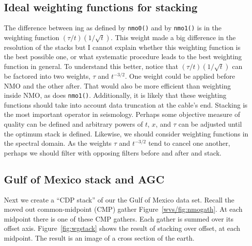 \subsection{Ideal weighting functions for stacking}
The difference between ing as defined by
\texttt{nmo0()}  and by
\texttt{nmo1()} 
is in the weighting function $(\tau/t)(1/\sqrt{t})$.
This weight made a big difference in the resolution of the stacks
but I cannot explain
whether this weighting function is the best possible one,
or what systematic procedure
leads to the best weighting function in general.
To understand this better, 
notice that $(\tau/t)(1/\sqrt{t})$
can be factored into two weights, $\tau$ and $t^{-3/2}$.
One weight could be applied before NMO and the other after.
That would also be more efficient than weighting inside NMO,
as does {\tt nmo1()}.
Additionally, it is likely that
these weighting functions should take into account
data truncation at the cable's end.
Stacking is the most important operator in seismology.
Perhaps some objective measure of quality can be defined
and arbitrary powers of $t$, $x$, and $\tau$
can be adjusted until the optimum stack is defined.
Likewise, we should consider weighting functions in the spectral domain.
As the weights $\tau$ and $t^{-3/2}$
tend to cancel one another,
perhaps we should filter with opposing filters
before and after  and stack.

\subsection{Gulf of Mexico stack and AGC}
\par
Next we create a ``CDP stack'' of our the Gulf of Mexico data set.
Recall the moved out common-midpoint (CMP) gather
Figure~\ref{wvs/fig:nmogath}.
At each midpoint there is one of these CMP gathers.
Each gather is summed over its offset axis.
Figure~\ref{fig:wgstack} shows the result of stacking over offset,
at each midpoint.
The result is an image of a cross section of the earth.

